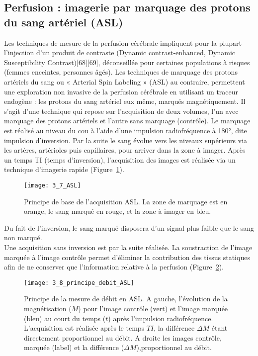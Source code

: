 \subsection{Perfusion : imagerie par marquage des protons du sang artériel (ASL)}
Les techniques de mesure de la perfusion cérébrale impliquent pour la plupart l’injection d’un
produit de contraste (Dynamic contrast-enhanced, Dynamic Susceptibility Contrast)[68][69],
déconseillée pour certaines populations à risques (femmes enceintes, personnes âgés). Les techniques
de marquage des protons artériels du sang ou « Arterial Spin Labeling » (ASL) au contraire, permettent
une exploration non invasive de la perfusion cérébrale en utilisant un traceur endogène : les protons
du sang artériel eux même, marqués magnétiquement. Il s’agit d’une technique qui repose sur
l’acquisition de deux volumes, l’un avec marquage des protons artériels et l’autre sans marquage
(contrôle). Le marquage est réalisé au niveau du cou à l’aide d’une impulsion radiofréquence à 180°,
dite impulsion d’inversion. Par la suite le sang évolue vers les niveaux supérieurs via les artères,
artérioles puis capillaires, pour arriver dans la zone à imager. Après un temps TI (temps d’inversion),
l’acquisition des images est réalisée via un technique d’imagerie rapide (Figure~\ref{fig:3_7_ASL}). 
\begin{figure}[!t]
\centering
\texttt{[image: 3\_7\_ASL]}
\caption{Principe de base de l'acquisition ASL. La zone de marquage est en orange, le sang marqué en rouge, et la zone à
imager en bleu.}
\label{fig:3_7_ASL}	
\end{figure}
Du fait de
l’inversion, le sang marqué disposera d’un signal plus faible que le sang non marqué.\\
Une acquisition sans inversion est par la suite réalisée. La soustraction de l’image marquée à
l’image contrôle permet d’éliminer la contribution des tissus statiques afin de ne conserver que
l’information relative à la perfusion (Figure~\ref{fig:3_8_principe_debit_ASL}).
\begin{figure}[!t]
\centering
\texttt{[image: 3\_8\_principe\_debit\_ASL]}
\caption{Principe de la mesure de débit en ASL. A gauche, l’évolution de la magnétisation ($M$) pour l’image contrôle (vert) et
l’image marquée (bleu) au court du temps ($t$) après l’impulsion radiofréquence. L’acquisition est réalisée après le temps $TI$, la
différence $\Delta M$ étant directement proportionnel au débit. A droite les images contrôle, marquée (label) et la différence ($\Delta M$),proportionnel au débit.}
\label{fig:3_8_principe_debit_ASL}	
\end{figure}

